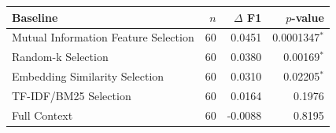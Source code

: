 \begin{tabular}{lrrr}
\toprule
Baseline & $n$ & $\Delta$ F1 & $p$-value \\
\midrule
Mutual Information Feature Selection & 60 & 0.0451 & 0.0001347$^*$ \\
Random-k Selection & 60 & 0.0380 & 0.00169$^*$ \\
Embedding Similarity Selection & 60 & 0.0310 & 0.02205$^*$ \\
TF-IDF/BM25 Selection & 60 & 0.0164 & 0.1976 \\
Full Context & 60 & -0.0088 & 0.8195 \\
\bottomrule
\end{tabular}
